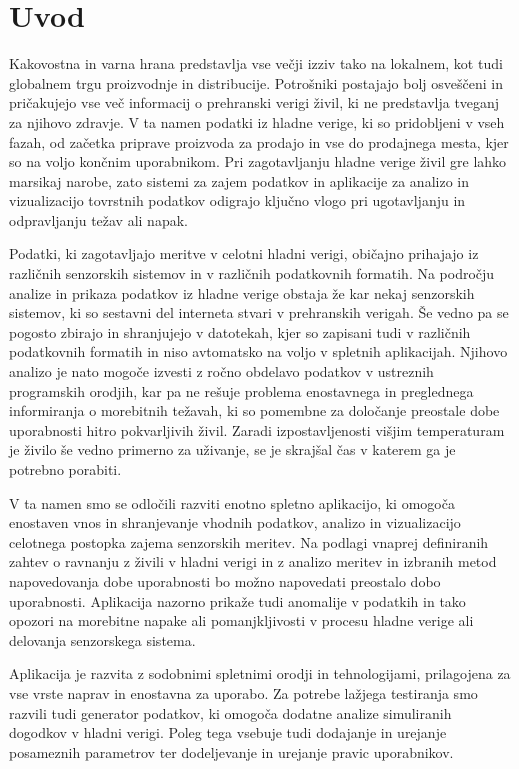 \documentclass[a4paper, 12pt]{book}
\begin{document}
\mainmatter
\setcounter{page}{1}
\pagestyle{fancy}

\chapter{Uvod}
Kakovostna in varna hrana predstavlja vse večji izziv tako na lokalnem, kot tudi globalnem trgu proizvodnje in distribucije. Potrošniki postajajo bolj osveščeni in pričakujejo vse več informacij o prehranski verigi živil, ki ne predstavlja tveganj za njihovo zdravje. V ta namen podatki iz hladne verige, ki so pridobljeni v vseh fazah, od začetka priprave proizvoda za prodajo in vse do prodajnega mesta, kjer so na voljo končnim uporabnikom. Pri zagotavljanju hladne verige živil gre lahko marsikaj narobe, zato sistemi za zajem podatkov in aplikacije za analizo in vizualizacijo tovrstnih podatkov odigrajo ključno vlogo pri ugotavljanju in odpravljanju težav ali napak. 

Podatki, ki zagotavljajo meritve v celotni hladni verigi, običajno prihajajo iz različnih senzorskih sistemov in v različnih podatkovnih formatih. Na področju analize in prikaza podatkov iz hladne verige obstaja že kar nekaj senzorskih sistemov, ki so sestavni del interneta stvari v prehranskih verigah. Še vedno pa se pogosto zbirajo in shranjujejo v datotekah, kjer so zapisani tudi v različnih podatkovnih formatih in  niso avtomatsko na voljo v spletnih aplikacijah. Njihovo analizo je nato mogoče izvesti z ročno obdelavo podatkov v ustreznih programskih orodjih, kar pa ne rešuje problema enostavnega in preglednega informiranja o morebitnih težavah, ki so pomembne za določanje preostale dobe uporabnosti hitro pokvarljivih živil. Zaradi izpostavljenosti višjim temperaturam je živilo še vedno primerno za uživanje, se je skrajšal čas v katerem ga je potrebno porabiti. 

V ta namen smo se odločili razviti enotno spletno aplikacijo, ki omogoča enostaven vnos in shranjevanje vhodnih podatkov, analizo in vizualizacijo celotnega postopka zajema senzorskih meritev. Na podlagi vnaprej definiranih zahtev o ravnanju z živili v hladni verigi in z analizo meritev in izbranih metod napovedovanja dobe uporabnosti  bo možno napovedati preostalo dobo uporabnosti. Aplikacija nazorno prikaže tudi anomalije v podatkih in tako opozori na morebitne napake ali pomanjkljivosti v procesu hladne verige ali delovanja senzorskega sistema.

Aplikacija je razvita z sodobnimi spletnimi orodji in tehnologijami, prilagojena za vse vrste naprav in enostavna za uporabo. Za potrebe lažjega testiranja smo razvili tudi generator podatkov, ki omogoča dodatne analize simuliranih dogodkov v hladni verigi. Poleg tega vsebuje tudi dodajanje in urejanje posameznih parametrov ter dodeljevanje in urejanje pravic uporabnikov.
\end{document}
